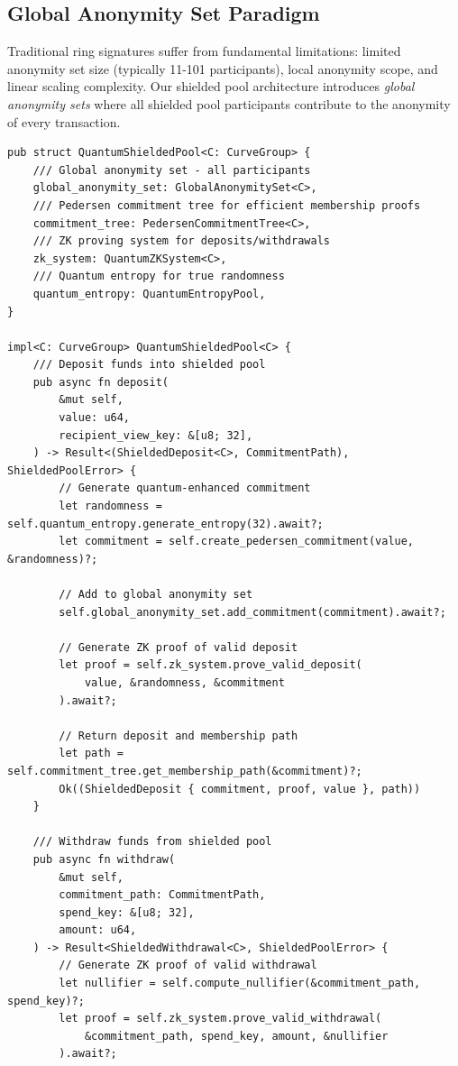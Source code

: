 \documentclass[12pt,a4paper]{article}
\begin{document}
\subsection{Global Anonymity Set Paradigm}

Traditional ring signatures suffer from fundamental limitations: limited anonymity set size (typically 11-101 participants), local anonymity scope, and linear scaling complexity. Our shielded pool architecture introduces \textit{global anonymity sets} where all shielded pool participants contribute to the anonymity of every transaction.

\begin{lstlisting}[style=rustcode, caption=Quantum Shielded Pool Implementation]
pub struct QuantumShieldedPool<C: CurveGroup> {
    /// Global anonymity set - all participants
    global_anonymity_set: GlobalAnonymitySet<C>,
    /// Pedersen commitment tree for efficient membership proofs
    commitment_tree: PedersenCommitmentTree<C>,
    /// ZK proving system for deposits/withdrawals
    zk_system: QuantumZKSystem<C>,
    /// Quantum entropy for true randomness
    quantum_entropy: QuantumEntropyPool,
}

impl<C: CurveGroup> QuantumShieldedPool<C> {
    /// Deposit funds into shielded pool
    pub async fn deposit(
        &mut self,
        value: u64,
        recipient_view_key: &[u8; 32],
    ) -> Result<(ShieldedDeposit<C>, CommitmentPath), ShieldedPoolError> {
        // Generate quantum-enhanced commitment
        let randomness = self.quantum_entropy.generate_entropy(32).await?;
        let commitment = self.create_pedersen_commitment(value, &randomness)?;
        
        // Add to global anonymity set
        self.global_anonymity_set.add_commitment(commitment).await?;
        
        // Generate ZK proof of valid deposit
        let proof = self.zk_system.prove_valid_deposit(
            value, &randomness, &commitment
        ).await?;
        
        // Return deposit and membership path
        let path = self.commitment_tree.get_membership_path(&commitment)?;
        Ok((ShieldedDeposit { commitment, proof, value }, path))
    }
    
    /// Withdraw funds from shielded pool
    pub async fn withdraw(
        &mut self,
        commitment_path: CommitmentPath,
        spend_key: &[u8; 32],
        amount: u64,
    ) -> Result<ShieldedWithdrawal<C>, ShieldedPoolError> {
        // Generate ZK proof of valid withdrawal
        let nullifier = self.compute_nullifier(&commitment_path, spend_key)?;
        let proof = self.zk_system.prove_valid_withdrawal(
            &commitment_path, spend_key, amount, &nullifier
        ).await?;
        

\end{lstlisting}
\end{document}
